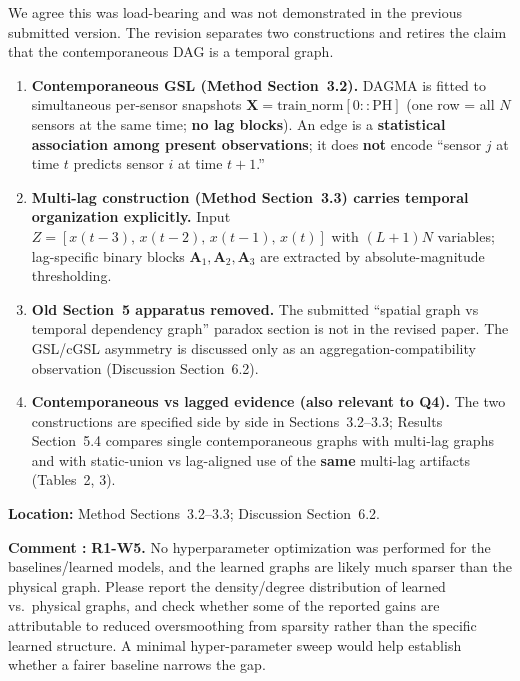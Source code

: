 \documentclass[a4paper,11pt]{article}
\newcounter{commentcounter}
\newcommand{\reviewercomment}[1]{%
    \stepcounter{commentcounter}%
    \begin{reviewerscomment}
        \textbf{Comment \arabic{commentcounter}:} #1
    \end{reviewerscomment}
}
\newcommand{\response}[1]{%
    \begin{myresponse}
        #1
    \end{myresponse}
    \vspace{5mm}
}
\begin{document}
\response{
We agree this was load-bearing and was not demonstrated in the previous submitted version. The revision separates two constructions and {retires} the claim that the contemporaneous DAG is a temporal graph.

\begin{enumerate}
    \item \textbf{Contemporaneous GSL (Method Section~3.2).}
    DAGMA is fitted to simultaneous per-sensor snapshots $\mathbf{X}=\mathrm{train\_norm}[0::\mathrm{PH}]$ (one row = all $N$ sensors at the same time; \textbf{no lag blocks}). An edge is a \textbf{statistical association among present observations}; it does \textbf{not} encode ``sensor $j$ at time $t$ predicts sensor $i$ at time $t+1$.''

    \item \textbf{Multi-lag construction (Method Section~3.3) carries temporal organization explicitly.}
    Input $Z=[x(t-3),\,x(t-2),\,x(t-1),\,x(t)]$ with $(L+1)N$ variables; lag-specific binary blocks $\mathbf{A}_1,\mathbf{A}_2,\mathbf{A}_3$ are extracted by absolute-magnitude thresholding.

    \item \textbf{Old Section~5 apparatus removed.}
    The submitted ``spatial graph vs temporal dependency graph'' paradox section is not in the revised paper. The GSL/cGSL asymmetry is discussed only as an aggregation-compatibility observation (Discussion Section~6.2).

    \item \textbf{Contemporaneous vs lagged evidence (also relevant to Q4).}
    The two constructions are specified side by side in Sections~3.2--3.3; Results Section~5.4 compares single contemporaneous graphs with multi-lag graphs and with static-union vs lag-aligned use of the \textbf{same} multi-lag artifacts (Tables~2, 3).
\end{enumerate}

\textbf{Location:} Method Sections~3.2--3.3; Discussion Section~6.2.
}

\reviewercomment{
\textbf{R1-W5.} No hyperparameter optimization was performed for the baselines/learned models, and the learned graphs are likely much sparser than the physical graph. Please report the density/degree distribution of learned vs.\ physical graphs, and check whether some of the reported gains are attributable to reduced oversmoothing from sparsity rather than the specific learned structure. A minimal hyper-parameter sweep would help establish whether a fairer baseline narrows the gap.
}
\end{document}
